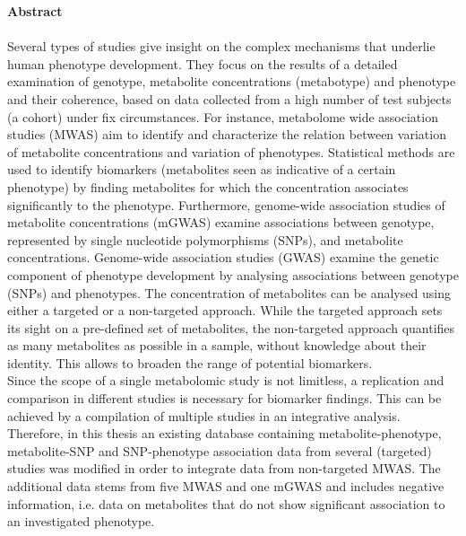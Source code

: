 \documentclass[a4paper, %
  12pt, %
  twoside
  ]{report} %
\numberwithin{figure}{chapter}
\begin{document}
\begin{titlepage}
\pagestyle{empty}

\end{titlepage}
\newpage
\thispagestyle{empty}
\textbf{ }
\newline
{\Large\textbf{Abstract\\\\}}
Several types of studies give insight on the complex mechanisms that underlie human phenotype development. They focus on the results of a detailed examination of genotype, metabolite concentrations (metabotype) and phenotype and their coherence, based on data collected from a high number of test subjects (a cohort) under fix circumstances.
For instance, metabolome wide association studies (MWAS) aim to identify and characterize the relation between variation of metabolite concentrations and variation of phenotypes. Statistical methods are used to identify biomarkers (metabolites seen as indicative of a certain phenotype) by finding metabolites for which the concentration associates significantly to the phenotype. Furthermore, genome-wide association studies of metabolite concentrations (mGWAS) examine associations between genotype, represented by single nucleotide polymorphisms (SNPs), and metabolite concentrations. Genome-wide association studies (GWAS) examine the genetic component of phenotype development by analysing associations between genotype (SNPs) and phenotypes. The concentration of metabolites can be analysed using either a targeted or a non-targeted approach. While the targeted approach sets its sight on a pre-defined set of metabolites, the non-targeted approach quantifies as many metabolites as possible in a sample, without knowledge about their identity. This allows to broaden the range of potential biomarkers.\\
Since the scope of a single metabolomic study is not limitless, a replication and comparison in different studies is necessary for biomarker findings. This can be achieved by a compilation of multiple studies in an integrative analysis. Therefore, in this thesis an existing database containing metabolite-phenotype, metabolite-SNP and SNP-phenotype association data from several (targeted) studies was modified in order to integrate data from non-targeted MWAS. The additional data stems from five MWAS and one mGWAS and includes negative information, i.e. data on metabolites that do not show significant association to an investigated phenotype.\\
\end{document}
